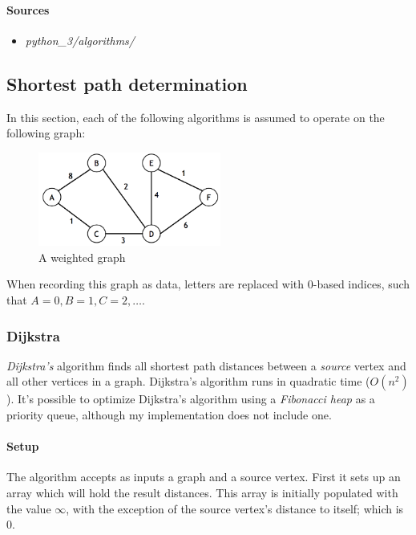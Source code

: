 \documentclass{article}
\begin{document}
\paragraph{Sources}
\begin{itemize}
\item{{\em python\_3/algorithms/}}
\end{itemize}



\newpage



\fi



\subsection{Shortest path determination}
In this section, each of the following algorithms is assumed to operate on the following graph:

\begin{figure}[H]
  \centering
  \includegraphics[width=6cm]{sample_graph}
  \caption{A weighted graph}
\end{figure}

When recording this graph as data, letters are replaced with 0-based indices, such that \(A=0, B=1, C=2, \dots\).


\subsubsection{Dijkstra}
{\em Dijkstra's} algorithm finds all shortest path distances between a {\em source} vertex and all other vertices
in a graph. Dijkstra's algorithm runs in quadratic time (\(O(n^2)\)). It's possible to optimize Dijkstra's algorithm
using a {\em Fibonacci heap} as a priority queue, although my implementation does not include one.

\paragraph{Setup}
The algorithm accepts as inputs a graph and a source vertex. First it sets up an array which will hold the result
distances. This array is initially populated with the value \(\infty\), with the exception of the source vertex's
distance to itself; which is 0.
\end{document}
